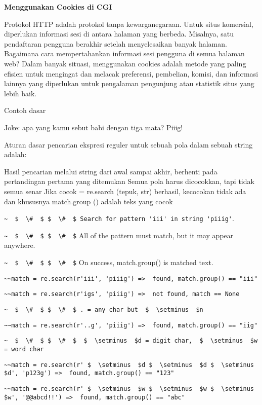 \begin {enumerate}
\begin {enumerate}
{\fontsize{14pt}{14pt}\selectfont \textbf{Menggunakan Cookies di CGI} \\}

Protokol HTTP adalah protokol tanpa kewarganegaraan. Untuk situs komersial, diperlukan informasi sesi di antara halaman yang berbeda. Misalnya, satu pendaftaran pengguna berakhir setelah menyelesaikan banyak halaman. Bagaimana cara mempertahankan informasi sesi pengguna di semua halaman web? Dalam banyak situasi, menggunakan cookies adalah metode yang paling efisien untuk mengingat dan melacak preferensi, pembelian, komisi, dan informasi lainnya yang diperlukan untuk pengalaman pengunjung atau statistik situs yang lebih baik.

Contoh dasar

Joke: apa yang kamu sebut babi dengan tiga mata? Piiig!

Aturan dasar pencarian ekspresi reguler untuk sebuah pola dalam sebuah string adalah:

Hasil pencarian melalui string dari awal sampai akhir, berhenti pada pertandingan pertama yang ditemukan  Semua pola harus dicocokkan, tapi tidak semua senar Jika cocok = re.search (tepuk, str) berhasil, kecocokan tidak ada dan khususnya match.group () adalah teks yang cocok

\verb|~  $  \#  $ $  \#  $ Search for pattern 'iii' in string 'piiig'|.

\verb|~  $  \#  $ $  \#  $| All of the pattern must match, but it may appear anywhere.

\verb|~  $  \#  $ $  \#  $| On success, match.group() is matched text.

\verb|~~match = re.search(r'iii', 'piiig') =>  found, match.group() == "iii"|

\verb|~~match = re.search(r'igs', 'piiig') =>  not found, match == None|

\verb|~  $  \#  $ $  \#  $ . = any char but  $  \setminus  $n|

\verb|~~match = re.search(r'..g', 'piiig') =>  found, match.group() == "iig"|

\verb|~  $  \#  $ $  \#  $  $  \setminus  $d = digit char,  $  \setminus  $w = word char|

\verb|~~match = re.search(r' $  \setminus  $d $  \setminus  $d $  \setminus  $d', 'p123g') =>  found, match.group() == "123"|

\verb|~~match = re.search(r' $  \setminus  $w $  \setminus  $w $  \setminus  $w', '@@abcd!!') =>  found, match.group() == "abc"|


\end{enumerate}
\end{enumerate}
